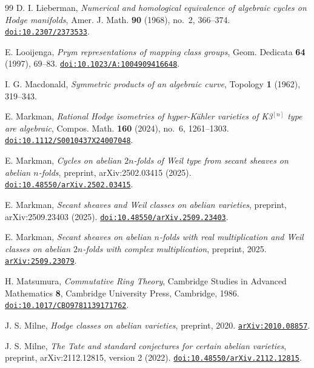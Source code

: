 \begin{thebibliography}{99}
D. I. Lieberman,
\emph{Numerical and homological equivalence of algebraic cycles on Hodge
manifolds},
Amer. J. Math. \textbf{90} (1968), no.~2, 366--374.
\href{https://doi.org/10.2307/2373533}{\texttt{doi:10.2307/2373533}}.

E. Looijenga,
\emph{Prym representations of mapping class groups},
Geom. Dedicata \textbf{64} (1997), 69--83.
\href{https://doi.org/10.1023/A:1004909416648}{\texttt{doi:10.1023/A:1004909416648}}.

I. G. Macdonald,
\emph{Symmetric products of an algebraic curve},
Topology \textbf{1} (1962), 319--343.

E. Markman,
\emph{Rational Hodge isometries of hyper-K\"ahler varieties of K3$^{[n]}$
type are algebraic},
Compos. Math. \textbf{160} (2024), no.~6, 1261--1303.
\href{https://doi.org/10.1112/S0010437X24007048}{\texttt{doi:10.1112/S0010437X24007048}}.

E. Markman,
\emph{Cycles on abelian $2n$-folds of Weil type from secant sheaves on abelian
$n$-folds}, preprint, arXiv:2502.03415 (2025).
\href{https://doi.org/10.48550/arXiv.2502.03415}{\texttt{doi:10.48550/arXiv.2502.03415}}.

E. Markman,
\emph{Secant sheaves and Weil classes on abelian varieties},
preprint, arXiv:2509.23403 (2025).
\href{https://doi.org/10.48550/arXiv.2509.23403}{\texttt{doi:10.48550/arXiv.2509.23403}}.

E. Markman,
\emph{Secant sheaves on abelian $n$-folds with real multiplication and Weil
classes on abelian $2n$-folds with complex multiplication},
preprint, 2025.
\href{https://arxiv.org/abs/2509.23079}{\texttt{arXiv:2509.23079}}.

H. Matsumura,
\emph{Commutative Ring Theory},
Cambridge Studies in Advanced Mathematics \textbf{8},
Cambridge University Press, Cambridge, 1986.
\href{https://doi.org/10.1017/CBO9781139171762}{\texttt{doi:10.1017/CBO9781139171762}}.

J. S. Milne,
\emph{Hodge classes on abelian varieties},
preprint, 2020.
\href{https://arxiv.org/abs/2010.08857}{\texttt{arXiv:2010.08857}}.

J. S. Milne,
\emph{The Tate and standard conjectures for certain abelian varieties},
preprint, arXiv:2112.12815, version 2 (2022).
\href{https://doi.org/10.48550/arXiv.2112.12815}{\texttt{doi:10.48550/arXiv.2112.12815}}.


\end{thebibliography}
